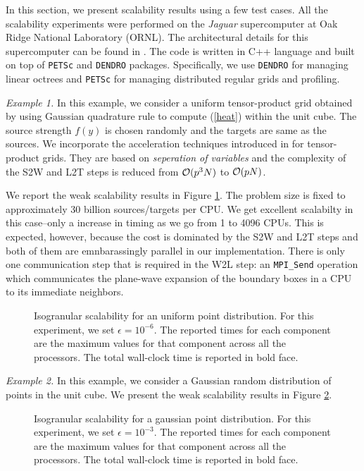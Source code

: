 In this section, we present scalability results using a few test cases.  All the scalability experiments were performed 
on the {\it{Jaguar}} supercomputer at Oak Ridge National Laboratory (ORNL). The architectural details for this supercomputer
 can be found in \cite{jaguar}. The code is written in C++ language and built on top of \texttt{PETSc} and \texttt{DENDRO} packages. 
 Specifically, we use \texttt{DENDRO} for managing linear octrees and \texttt{PETSc} for managing distributed regular grids and profiling. 


{\em Example 1.} In this example, we consider a uniform tensor-product grid obtained by using Gaussian quadrature rule to compute (\ref{heat}) within the unit cube. The source strength $f(y)$ is chosen randomly and the targets are same as the sources. We incorporate the acceleration techniques introduced in \cite{fggt} for tensor-product grids. They are based on 
{\em seperation of variables} and the complexity of the S2W and L2T steps is reduced from $\mathcal{O}(p^3 N)$ to $\mathcal{O}(p N)$. 

We report the weak scalability results in Figure \ref{fig:uniform}. The problem size is fixed to approximately 30 billion sources/targets per CPU. We get excellent scalabilty in this case--only a  increase in timing as we go from 1 to 4096 CPUs. This is expected, however, because the cost is dominated by the S2W and L2T steps and both of them are emnbarassingly parallel in our implementation. There is only one communication step that is required in the W2L step: an \texttt{MPI\_Send} operation which communicates the plane-wave expansion of the boundary boxes in a CPU to its immediate neighbors. 

\begin{figure}
	\begin{center}
	
	\end{center}
\caption{\label{f:isoUniform} Isogranular scalability for an uniform point distribution. For
 this experiment, we set $\epsilon = 10^{-6}$. The reported times for 
each component are the maximum values for that component across all the processors. The total wall-clock
time is reported in bold face.} \label{fig:uniform}
\end{figure}

{\em Example 2.} In this example, we consider a Gaussian random distribution of points in the unit cube. 
We present the weak scalability results in Figure \ref{fig:nonuniform}. 

\begin{figure}
	\begin{center}
	
	\end{center}
\caption{\label{f:isoGaussian} Isogranular scalability for a gaussian point distribution. For
 this experiment, we set $\epsilon = 10^{-3}$. The reported times for each component are the
 maximum values for that component across all the processors. The total wall-clock
time is reported in bold face.} \label{fig:nonuniform}
\end{figure}
